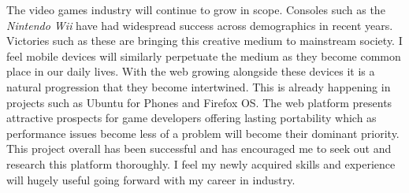 \documentclass[final]{cmpreport}
\begin{document}

The video games industry will continue to grow in scope. Consoles such as the \textit{Nintendo Wii} have had widespread success across demographics in recent years. Victories such as these are bringing this creative medium to mainstream society. I feel mobile devices will similarly perpetuate the medium as they become common place in our daily lives. With the web growing alongside these devices it is a natural progression that they become intertwined. This is already happening in projects such as Ubuntu for Phones and Firefox OS. The web platform presents attractive prospects for game developers offering lasting portability which as performance issues become less of a problem will become their dominant priority. This project overall has been successful and has encouraged me to seek out and research this platform thoroughly. I feel my newly acquired skills and experience will hugely useful going forward with my career in industry.

\clearpage

\end{document}

